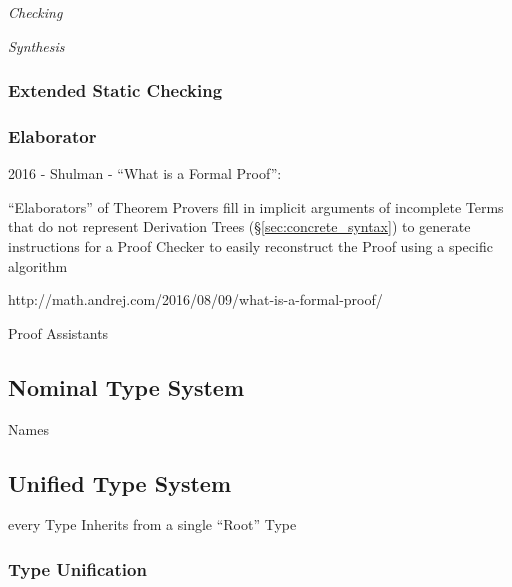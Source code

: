 \emph{Checking}

\emph{Synthesis}



\subsubsection{Extended Static Checking}\label{sec:extended_static}

\subsubsection{Elaborator}\label{sec:elaborator}

2016 - Shulman - ``What is a Formal Proof'': %

``Elaborators'' of Theorem Provers fill in implicit arguments of
incomplete Terms that do not represent Derivation Trees
(\S\ref{sec:concrete_syntax}) to generate instructions for a Proof
Checker to easily reconstruct the Proof using a specific algorithm

http://math.andrej.com/2016/08/09/what-is-a-formal-proof/ %

Proof Assistants %



\subsection{Nominal Type System}\label{sec:nominal_type_system}

Names



\subsection{Unified Type System}\label{sec:unified_type_system}

every Type Inherits from a single ``Root'' Type



\subsubsection{Type Unification}\label{sec:type_unification}




